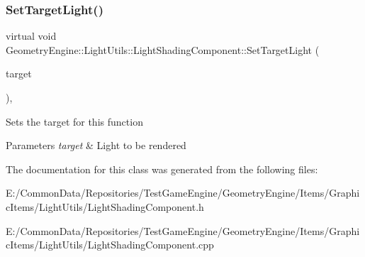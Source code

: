 \mbox{\label{class_geometry_engine_1_1_light_utils_1_1_light_shading_component_aa2e50470089c2d17b76dd18bdf1a1a68}} 
\subsubsection{\texorpdfstring{SetTargetLight()}{SetTargetLight()}}
{\footnotesize\ttfamily virtual void Geometry\+Engine\+::\+Light\+Utils\+::\+Light\+Shading\+Component\+::\+Set\+Target\+Light (\begin{DoxyParamCaption}\item[{\mbox{\hyperlink{class_geometry_engine_1_1_geometry_world_item_1_1_geometry_light_1_1_light}{Geometry\+World\+Item\+::\+Geometry\+Light\+::\+Light}} $\ast$}]{target }\end{DoxyParamCaption})\hspace{0.3cm}{\ttfamily [inline]}, {\ttfamily [virtual]}}

Sets the target for this function 
\begin{DoxyParams}{Parameters}
{\em target} & Light to be rendered \\
\hline
\end{DoxyParams}


The documentation for this class was generated from the following files\+:\begin{DoxyCompactItemize}
\item 
E\+:/\+Common\+Data/\+Repositories/\+Test\+Game\+Engine/\+Geometry\+Engine/\+Items/\+Graphic\+Items/\+Light\+Utils/Light\+Shading\+Component.\+h\item 
E\+:/\+Common\+Data/\+Repositories/\+Test\+Game\+Engine/\+Geometry\+Engine/\+Items/\+Graphic\+Items/\+Light\+Utils/Light\+Shading\+Component.\+cpp\end{DoxyCompactItemize}
